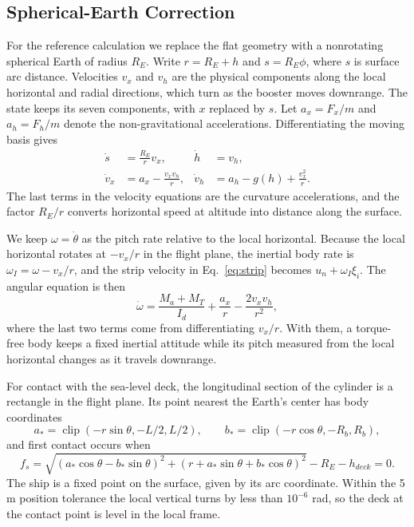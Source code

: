 \subsection{Spherical-Earth Correction}
\label{sec:sphere}
For the reference calculation we replace the flat geometry with a nonrotating spherical Earth of radius $R_E$. Write $r=R_E+h$ and $s=R_E\phi$, where $s$ is surface arc distance. Velocities $v_x$ and $v_h$ are the physical components along the local horizontal and radial directions, which turn as the booster moves downrange. The state keeps its seven components, with $x$ replaced by $s$. Let $a_x=F_x/m$ and $a_h=F_h/m$ denote the non-gravitational accelerations. Differentiating the moving basis gives
\begin{align}\label{eq:sphere}
 \dot s&=\frac{R_E}{r}v_x,&\dot h&=v_h,\\
 \dot v_x&=a_x-\frac{v_xv_h}{r},&
 \dot v_h&=a_h-g(h)+\frac{v_x^2}{r}.
\end{align}
The last terms in the velocity equations are the curvature accelerations, and the factor $R_E/r$ converts horizontal speed at altitude into distance along the surface.

We keep $\omega=\dot\theta$ as the pitch rate relative to the local horizontal. Because the local horizontal rotates at $-v_x/r$ in the flight plane, the inertial body rate is $\omega_I=\omega-v_x/r$, and the strip velocity in Eq.~\eqref{eq:strip} becomes $u_n+\omega_I \xi_i$. The angular equation is then
\begin{equation}\label{eq:spherepitch}
 \dot\omega=\frac{M_a+M_T}{I_d}+\frac{a_x}{r}-\frac{2v_xv_h}{r^2},
\end{equation}
where the last two terms come from differentiating $v_x/r$. With them, a torque-free body keeps a fixed inertial attitude while its pitch measured from the local horizontal changes as it travels downrange.

For contact with the sea-level deck, the longitudinal section of the cylinder is a rectangle in the flight plane. Its point nearest the Earth's center has body coordinates
\begin{equation}
 a_* = \operatorname{clip}(-r\sin\theta,-L/2,L/2),\qquad
 b_* = \operatorname{clip}(-r\cos\theta,-R_b,R_b),
\end{equation}
and first contact occurs when
\begin{equation}\label{eq:spherecontact}
 f_s=\sqrt{(a_*\cos\theta-b_*\sin\theta)^2+(r+a_*\sin\theta+b_*\cos\theta)^2}-R_E-h_{deck}=0.
\end{equation}
The ship is a fixed point on the surface, given by its arc coordinate. Within the 5 m position tolerance the local vertical turns by less than $10^{-6}$ rad, so the deck at the contact point is level in the local frame.
